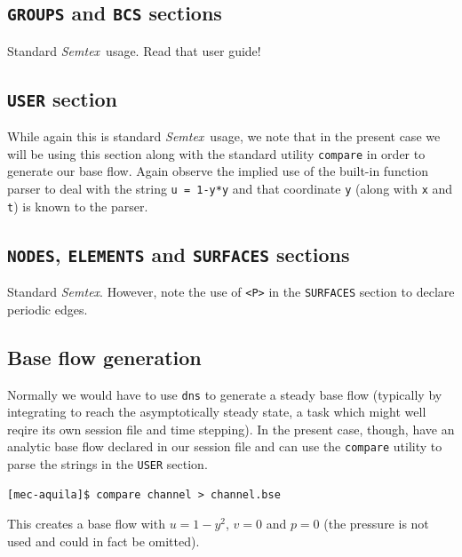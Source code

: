 \documentclass[11pt,a4paper]{report}
\newcommand{\Semtex}{\emph{Semtex}}
\begin{document}
\subsection{\texttt{GROUPS} and \texttt{BCS} sections}

Standard \Semtex\ usage. Read that user guide!

\subsection{\texttt{USER} section}

While again this is standard \Semtex\ usage, we note that in the
present case we will be using this section along with the standard
utility \texttt{compare} in order to generate our base flow.  Again
observe the implied use of the built-in function parser to deal with
the string \verb+u = 1-y*y+ and that coordinate \verb+y+ (along with
\verb+x+ and \verb+t+) is known to the parser.

\subsection{\texttt{NODES}, \texttt{ELEMENTS} and \texttt{SURFACES} sections}

Standard \Semtex.  However, note the use of \verb+<P>+ in the
\verb+SURFACES+ section to declare periodic edges.

\subsection{Base flow generation}

Normally we would have to use \texttt{dns} to generate a steady base
flow (typically by integrating to reach the asymptotically steady
state, a task which might well reqire its own session file and time
stepping).  In the present case, though, have an analytic base flow
declared in our session file and can use the \verb+compare+ utility to
parse the strings in the \verb+USER+ section.
{\small
\begin{verbatim}
[mec-aquila]$ compare channel > channel.bse
\end{verbatim}
} This creates a base flow with $u=1-y^2$, $v=0$ and $p=0$ (the
pressure is not used and could in fact be omitted).
\end{document}
